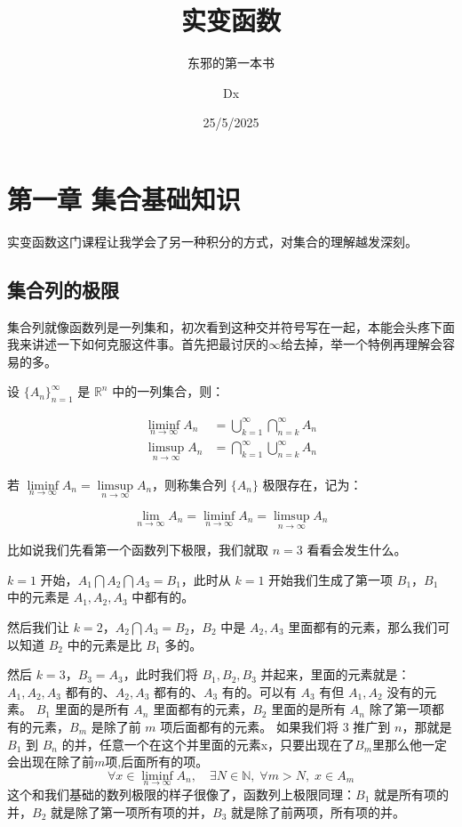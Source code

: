 \documentclass[lang=cn,10pt]{elegantbook}
\title{实变函数}
\subtitle{东邪的第一本书}
\author{Dx}
\date{25/5/2025}
\let\oldliminf\liminf
\renewcommand{\liminf}{\mathop{\oldliminf}\limits}
\let\oldlimsup\limsup
\renewcommand{\limsup}{\mathop{\oldlimsup}\limits}
\begin{document}
\maketitle
\frontmatter

\tableofcontents

\mainmatter

\chapter{第一章 集合基础知识}
实变函数这门课程让我学会了另一种积分的方式，对集合的理解越发深刻。







\section{集合列的极限}
集合列就像函数列是一列集和，初次看到这种交并符号写在一起，本能会头疼下面我来讲述一下如何克服这件事。首先把最讨厌的$\infty$给去掉，举一个特例再理解会容易的多。
\begin{definition}
    设 $\{A_n\}_{n=1}^\infty$ 是 $\mathbb{R}^n$ 中的一列集合，则：

\begin{align*}
\liminf_{n \to \infty} A_n &= \bigcup_{k=1}^\infty \bigcap_{n = k}^\infty A_n \\[1em]
\limsup_{n \to \infty} A_n &= \bigcap_{k=1}^\infty \bigcup_{n = k}^\infty A_n
\end{align*}

若 $\liminf_{n \to \infty} A_n = \limsup_{n \to \infty} A_n$，则称集合列 $\{A_n\}$ 极限存在，记为：

\[
\lim_{n \to \infty} A_n = \liminf_{n \to \infty} A_n = \limsup_{n \to \infty} A_n
\]
\end{definition}
比如说我们先看第一个函数列下极限，我们就取 $n=3$ 看看会发生什么。

$k=1$ 开始，$A_1 \bigcap A_2 \bigcap A_3 = B_1$，此时从 $k=1$ 开始我们生成了第一项 $B_1$，$B_1$ 中的元素是 $A_1,A_2,A_3$ 中都有的。

然后我们让 $k=2$，$A_2 \bigcap A_3 = B_2$，$B_2$ 中是 $A_2,A_3$ 里面都有的元素，那么我们可以知道 $B_2$ 中的元素是比 $B_1$ 多的。

然后 $k=3$，$B_3 = A_3$，此时我们将 $B_1,B_2,B_3$ 并起来，里面的元素就是：$A_1,A_2,A_3$ 都有的、$A_2,A_3$ 都有的、$A_3$ 有的。可以有 $A_3$ 有但 $A_1,A_2$ 没有的元素。
$B_1$ 里面的是所有 $A_n$ 里面都有的元素，$B_2$ 里面的是所有 $A_n$ 除了第一项都有的元素，$B_m$ 是除了前 $m$ 项后面都有的元素。
如果我们将 $3$ 推广到 $n$，那就是 $B_1$ 到 $B_n$ 的并，任意一个在这个并里面的元素x，只要出现在了$B_m$里那么他一定会出现在除了前$m$项,后面所有的项。
\[
\forall x \in \liminf_{n \to \infty} A_n, \quad \exists N \in \mathbb{N}, \; \forall m > N, \; x \in A_m
\] 
这个和我们基础的数列极限的样子很像了，函数列上极限同理：$B_1$ 就是所有项的并，$B_2$ 就是除了第一项所有项的并，$B_3$ 就是除了前两项，所有项的并。
\end{document}
